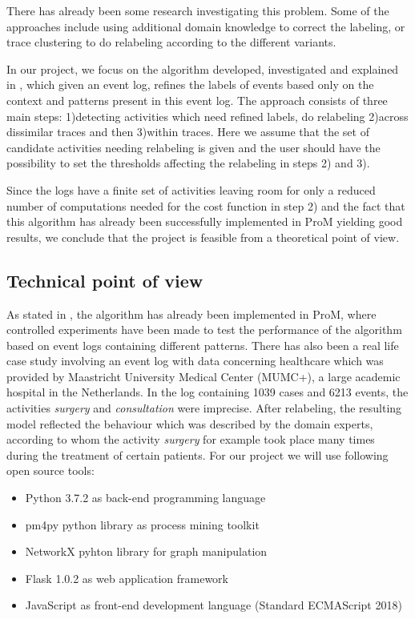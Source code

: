 \documentclass[notitlepage]{article}
\begin{document}
\begin{flushleft}
There has already been some research investigating this problem. 
Some of the approaches include using additional domain knowledge to correct the labeling, or trace clustering to do relabeling according to the different variants.

In our project, we focus on the algorithm developed, investigated and explained in \cite{paper}, which given an event log, refines the labels of events based only on the context and patterns present in this event log.
The approach consists of three main steps: 1)detecting activities which need refined labels, do relabeling 2)across dissimilar traces and then 3)within traces.
Here we assume that the set of candidate activities needing relabeling is given and the user should have the possibility to set the thresholds affecting the relabeling in steps 2) and 3).

Since the logs have a finite set of activities leaving room for only a reduced number of computations needed for the cost function in step 2) and the fact that this algorithm has already been successfully implemented in ProM yielding good results, we conclude that the project is feasible from a theoretical point of view.\\

\subsection{Technical point of view}

As stated in \cite{paper}, the algorithm has already been implemented in ProM, where controlled experiments have been made to test the performance of the algorithm based on event logs containing different patterns.
There has also been a real life case study involving an event log with data concerning healthcare which was provided by Maastricht University Medical Center (MUMC+), a large academic hospital in the Netherlands.
In the log containing 1039 cases and 6213 events, the activities \textit{surgery} and \textit{consultation} were imprecise.
After relabeling, the resulting model reflected the behaviour which was described by the domain experts, according to whom the activity \textit{surgery} for example took place many times during the treatment of certain patients.
\medskip
For our project we will use following open source tools: 
\medskip
\begin{itemize}
	\item Python 3.7.2 as back-end programming language
	\item pm4py python library as process mining toolkit
  \item NetworkX pyhton library for graph manipulation
  \item Flask 1.0.2 as web application framework
	\item JavaScript as front-end development language (Standard ECMAScript 2018)
\end{itemize}


\end{flushleft}
\end{document}
